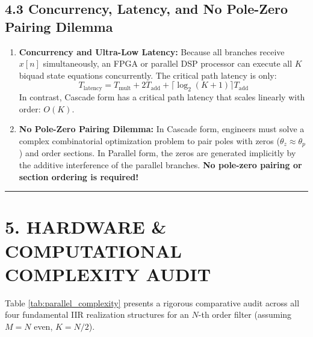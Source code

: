 \documentclass[11pt,a4paper]{article}
\begin{document}
\subsection{4.3 Concurrency, Latency, and No Pole-Zero Pairing Dilemma}
\begin{enumerate}
    \item \textbf{Concurrency and Ultra-Low Latency:} Because all branches receive $x[n]$ simultaneously, an FPGA or parallel DSP processor can execute all $K$ biquad state equations concurrently. The critical path latency is only:
    \begin{equation}
    T_{\text{latency}} = T_{\text{mult}} + 2 T_{\text{add}} + \lceil \log_2(K+1) \rceil T_{\text{add}}
    \end{equation}
    In contrast, Cascade form has a critical path latency that scales linearly with order: $O(K)$.
    \item \textbf{No Pole-Zero Pairing Dilemma:} In Cascade form, engineers must solve a complex combinatorial optimization problem to pair poles with zeros ($\theta_z \approx \theta_p$) and order sections. In Parallel form, the zeros are generated implicitly by the additive interference of the parallel branches. \textbf{No pole-zero pairing or section ordering is required!}
\end{enumerate}

\noindent\rule{\textwidth}{0.5pt}

\section{5. HARDWARE \& COMPUTATIONAL COMPLEXITY AUDIT}

Table \ref{tab:parallel_complexity} presents a rigorous comparative audit across all four fundamental IIR realization structures for an $N$-th order filter (assuming $M = N$ even, $K = N/2$).
\end{document}
